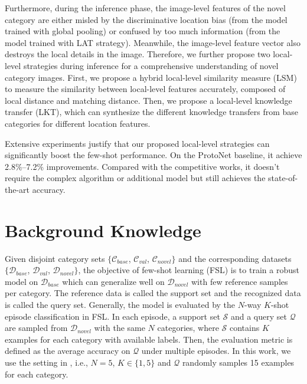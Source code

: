 \documentclass{article}
\begin{document}
Furthermore, during the inference phase, the image-level features of the novel category are either misled by the discriminative location bias (from the model trained with global pooling) or confused by too much information (from the model trained with LAT strategy). Meanwhile, the image-level feature vector also destroys the local details in the image. Therefore, we further propose two local-level strategies during inference for a comprehensive understanding of novel category images. First, we propose a hybrid local-level similarity measure (LSM) to measure the similarity between local-level features accurately, composed of local distance and matching distance. Then, we propose a local-level knowledge transfer (LKT), which can synthesize the different knowledge transfers from base categories for different location features.

Extensive experiments justify that our proposed local-level strategies can significantly boost the few-shot performance. On the ProtoNet \cite{snell2017prototypical} baseline, it achieve 2.8$\%$–7.2$\%$ improvements. Compared with the competitive works, it doesn't require the complex algorithm \cite{zhang2020deepemd} or additional model \cite{multi-pro, ye2020set} but still achieves the state-of-the-art accuracy.


\section{Background Knowledge}
\label{sec:preliminary}

Given disjoint category sets $\{\mathcal C_{base}$, $\mathcal C_{val}$, $\mathcal C_{novel}\}$ and the corresponding datasets $\{\mathcal D_{base}$, $\mathcal D_{val}$, $\mathcal D_{novel}\}$, the objective of few-shot learning (FSL) is to train a robust model on $\mathcal D_{base}$ which can generalize well on $\mathcal D_{novel}$ with few reference samples per category. The reference data is called the support set and the recognized data is called the query set. Generally, the model is evaluated by the $N$-way $K$-shot episode classification \cite{vinyals2016matching} in FSL. In each episode, a support set $\mathcal S$ and a query set $\mathcal Q$ are sampled from $\mathcal D_{novel}$ with the same $N$ categories, where $\mathcal S$ contains $K$ examples for each category with available labels. Then, the evaluation metric is defined as the average accuracy on $\mathcal Q$ under multiple episodes. In this work, we use the setting in \cite{vinyals2016matching}, i.e., $N = 5$, $K \in \{1, 5\}$ and $\mathcal Q$ randomly samples 15 examples for each category.
\end{document}
